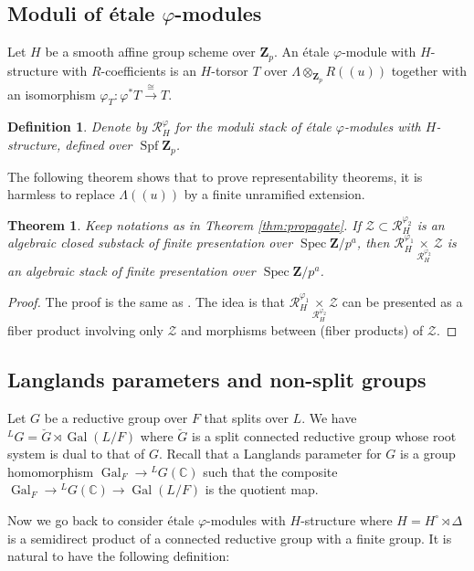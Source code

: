 \documentclass[11pt]{amsart}
\newtheorem{thm}{Theorem}
\newtheorem{dfn}{Definition}
\numberwithin{thm}{section}
\numberwithin{lem}{section}
\numberwithin{cor}{section}
\numberwithin{prop}{section}
\numberwithin{exam}{section}
\numberwithin{dfn}{section}
\newcommand{\Gal}{\operatorname{Gal}}
\newcommand{\spf}{\operatorname{Spf}}
\newcommand{\spec}{\operatorname{Spec}}
\newcommand{\bC}{\mathbb{C}}
\newcommand{\cZ}{\mathcal{Z}}
\newcommand{\clR}{\mathcal{R}}
\newcommand{\bG}{\breve{G}}
\newcommand{\Z}{\mathbf{Z}}
\newcommand{\lsup}[2]{{^{#1}\!#2}}
\begin{document}
\subsection{Moduli of \'etale $\varphi$-modules}
Let $H$ be a smooth affine group scheme over $\Z_p$.
An \'etale $\varphi$-module with $H$-structure
with $R$-coefficients
is an $H$-torsor $T$ over $\Lambda\otimes_{\Z_p}R(\!(u)\!)$
together with an isomorphism
$\varphi_T:\varphi^*T\xrightarrow{\cong} T$.

\begin{dfn}
Denote by $\clR_H^\varphi$
for the moduli stack of \'etale $\varphi$-modules
with $H$-structure,
defined over $\spf \Z_p$.
\end{dfn}

The following theorem shows
that to prove representability theorems,
it is harmless
to replace $\Lambda(\!(u)\!)$
by a finite unramified extension.


\begin{thm}
Keep notations as in Theorem \ref{thm:propagate}.
If $\cZ\subset \clR_{H}^{\varphi_2}$
is an algebraic closed substack
of finite presentation over $\spec \Z/p^a$,
then
$\clR_H^{\varphi_1}
\underset{\clR_H^{\varphi_2}}{\times}
\cZ$
is an algebraic stack of finite presentation over
$\spec \Z/p^a$.
\label{thm:restrict}
\end{thm}

\begin{proof}
The proof is the same as \cite[Lemma 3.7.5]{EG23}.
The idea is that $\clR_H^{\varphi_1}
\underset{\clR_H^{\varphi_2}}{\times}\cZ$
can be presented as
a fiber product involving
only $\cZ$
and morphisms between (fiber products)
of $\cZ$.
\end{proof}

\subsection{Langlands parameters
and non-split groups}

Let $G$ be a reductive group over $F$
that splits over $L$.
We have $\lsup LG=\bG\rtimes\Gal(L/F)$
where $\bG$ is a split connected reductive group
whose root system is dual to that of $G$.
Recall that a Langlands parameter for $G$
is a group homomorphism
$\Gal_F\to \lsup LG(\bC)$
such that the composite
$\Gal_F\to \lsup LG(\bC)\to \Gal(L/F)$
is the quotient map.

Now we go back to consider \'etale $\varphi$-modules
with $H$-structure
where $H=H^\circ\rtimes \Delta$
is a semidirect product of a connected reductive group
with a finite group.
It is natural to have the following definition:
\end{document}
